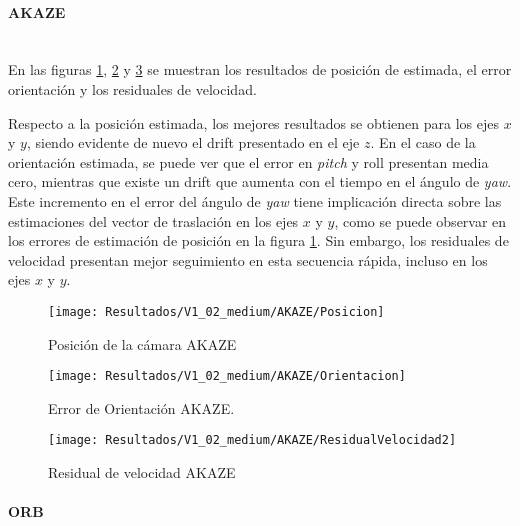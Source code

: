 \paragraph {AKAZE \\ \\}

En las figuras \ref{imagen:Resultados/V1_02_medium/AKAZE/Posicion}, \ref{imagen:Resultados/V1_02_medium/AKAZE/Orientacion} y \ref{imagen:Resultados/V1_02_medium/AKAZE/ResidualVelocidad} se muestran los resultados de posición de estimada, el error orientación y los residuales de velocidad.

Respecto a la posición estimada, los mejores resultados se obtienen para los ejes $x$ y $y$, siendo evidente de nuevo el drift presentado en el eje $z$. En el caso de la orientación estimada, se puede ver que el error en \textit{pitch} y roll presentan media cero, mientras que existe un drift que aumenta con el tiempo en el ángulo de \textit{yaw}. Este incremento en el error del ángulo de \textit{yaw} tiene implicación directa sobre las estimaciones del vector de traslación en los ejes $x$ y $y$, como se puede observar en los errores de estimación de posición en la figura \ref{imagen:Resultados/V1_02_medium/AKAZE/Posicion}. Sin embargo, los residuales de velocidad presentan mejor seguimiento en esta secuencia rápida, incluso en los ejes $x$ y $y$.
	
	
\begin{figure}[H]
	\centering
	\texttt{[image: Resultados/V1\_02\_medium/AKAZE/Posicion]}
	\caption{Posición de la cámara AKAZE}
	\label{imagen:Resultados/V1_02_medium/AKAZE/Posicion}
\end{figure}


\begin{figure}[H]
	\centering
	\texttt{[image: Resultados/V1\_02\_medium/AKAZE/Orientacion]}
	\caption[Error de Orientación AKAZE]{Error de Orientación AKAZE.}
	\label{imagen:Resultados/V1_02_medium/AKAZE/Orientacion}
\end{figure}



\begin{figure}[H]
	\centering
	\texttt{[image: Resultados/V1\_02\_medium/AKAZE/ResidualVelocidad2]}
	\caption{Residual de velocidad AKAZE}
	\label{imagen:Resultados/V1_02_medium/AKAZE/ResidualVelocidad}
\end{figure}

\paragraph {ORB \\ \\}


